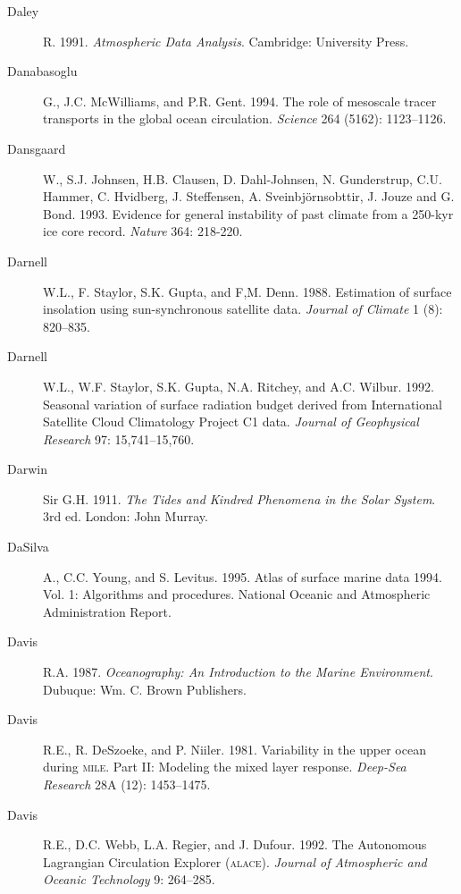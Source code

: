 \begin{description}
\item [Daley]R. 1991. \textit{Atmospheric Data Analysis}.  Cambridge: University Press.

\item [Danabasoglu]G., J.C. McWilliams, and P.R. Gent. 1994. The role of
mesoscale tracer transports in the global ocean circulation. \textit{Science} 264
(5162): 1123--1126.

\item [Dansgaard]W., S.J. Johnsen, H.B. Clausen, D. Dahl-Johnsen, N.
Gunderstrup, C.U. Hammer, C. Hvidberg, J. Steffensen, A. Sveinbjörnsobttir, J.
Jouze and G. Bond. 1993. Evidence for general instability of past climate from
a 250-kyr ice core record. \textit{Nature} 364: 218-220.

\item [Darnell]W.L., F. Staylor, S.K. Gupta, and F,M. Denn. 1988. Estimation of
surface insolation using sun-synchronous satellite data. \textit{Journal of Climate} 1
(8): 820--835.

\item [Darnell]W.L., W.F. Staylor, S.K. Gupta, N.A. Ritchey, and A.C. Wilbur.
1992. Seasonal variation of surface radiation budget derived from International
Satellite Cloud Climatology Project C1 data. \textit{Journal of Geophysical
Research} 97: 15,741--15,760.

\item [Darwin]Sir G.H. 1911. \textit{The Tides and Kindred Phenomena in the Solar
System}. 3rd ed.  London: John Murray.

\item [DaSilva]A., C.C. Young, and S. Levitus. 1995. Atlas of surface marine
data 1994. Vol. 1: Algorithms and procedures. National Oceanic and Atmospheric
Administration Report.

\item [Davis]R.A. 1987. \textit{Oceanography: An Introduction to the Marine
Environment}. Dubuque: Wm. C. Brown Publishers.

\item [Davis]R.E., R. DeSzoeke, and P. Niiler. 1981. Variability in the upper
ocean during \textsc{mile}. Part II: Modeling the mixed layer response. \textit{Deep-Sea
Research} 28A (12): 1453--1475.

\item [Davis]R.E., D.C. Webb, L.A. Regier, and J. Dufour. 1992. The
Autonomous Lagrangian Circulation Explorer (\textsc{alace}). \textit{Journal of Atmospheric and Oceanic Technology} 9: 264--285.


\end{description}
